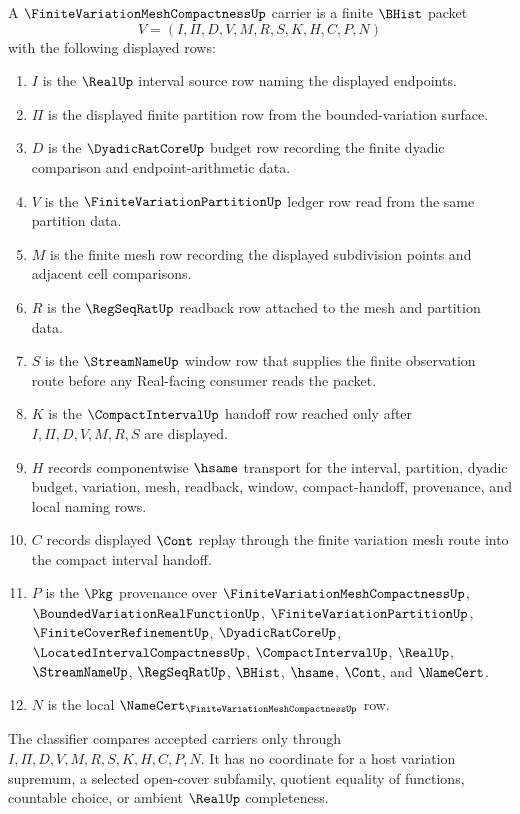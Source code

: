 \begin{definition}
\label{def:finite-variation-mesh-compactness-carrier}
A $\FiniteVariationMeshCompactnessUp$ carrier is a finite $\BHist$ packet
$$
V=(I,\Pi,D,V,M,R,S,K,H,C,P,N)
$$
with the following displayed rows:
\begin{enumerate}
\item $I$ is the $\RealUp$ interval source row naming the displayed endpoints.
\item $\Pi$ is the displayed finite partition row from the bounded-variation surface.
\item $D$ is the $\DyadicRatCoreUp$ budget row recording the finite dyadic comparison and endpoint-arithmetic data.
\item $V$ is the $\FiniteVariationPartitionUp$ ledger row read from the same partition data.
\item $M$ is the finite mesh row recording the displayed subdivision points and adjacent cell comparisons.
\item $R$ is the $\RegSeqRatUp$ readback row attached to the mesh and partition data.
\item $S$ is the $\StreamNameUp$ window row that supplies the finite observation route before any Real-facing consumer reads the packet.
\item $K$ is the $\CompactIntervalUp$ handoff row reached only after $I,\Pi,D,V,M,R,S$ are displayed.
\item $H$ records componentwise $\hsame$ transport for the interval, partition, dyadic budget, variation, mesh, readback, window, compact-handoff, provenance, and local naming rows.
\item $C$ records displayed $\Cont$ replay through the finite variation mesh route into the compact interval handoff.
\item $P$ is the $\Pkg$ provenance over $\FiniteVariationMeshCompactnessUp$, $\BoundedVariationRealFunctionUp$, $\FiniteVariationPartitionUp$, $\FiniteCoverRefinementUp$, $\DyadicRatCoreUp$, $\LocatedIntervalCompactnessUp$, $\CompactIntervalUp$, $\RealUp$, $\StreamNameUp$, $\RegSeqRatUp$, $\BHist$, $\hsame$, $\Cont$, and $\NameCert$.
\item $N$ is the local $\NameCert_{\FiniteVariationMeshCompactnessUp}$ row.
\end{enumerate}
The classifier compares accepted carriers only through $I,\Pi,D,V,M,R,S,K,H,C,P,N$. It has no coordinate for a host variation supremum, a selected open-cover subfamily, quotient equality of functions, countable choice, or ambient $\RealUp$ completeness.
\end{definition}

